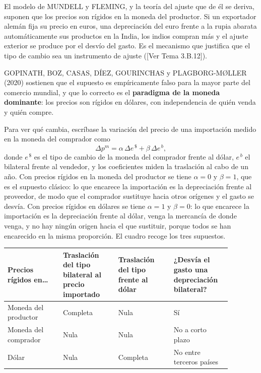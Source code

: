 \documentclass[10pt,a4paper]{article}
\newcommand{\authorfont}[1]{{\fontfamily{EBGaramond-TLF}\selectfont #1}}
\begin{document}
El modelo de MUNDELL y FLEMING, y la teoría del ajuste que de él se deriva, suponen que los precios son rígidos en la moneda del productor. Si un exportador alemán fija su precio en euros, una depreciación del euro frente a la rupia abarata automáticamente sus productos en la India, los indios compran más y el ajuste exterior se produce por el desvío del gasto. Es el mecanismo que justifica que el tipo de cambio sea un instrumento de ajuste ([\authorfont{Ver Tema 3.B.12}]).

GOPINATH, BOZ, CASAS, DÍEZ, GOURINCHAS y PLAGBORG-MØLLER (2020) sostienen que el supuesto es empíricamente falso para la mayor parte del comercio mundial, y que lo correcto es el \textbf{paradigma de la moneda dominante}: los precios son rígidos en dólares, con independencia de quién venda y quién compre.

Para ver qué cambia, escríbase la variación del precio de una importación medido en la moneda del comprador como
$$\Delta p^{m} = \alpha\,\Delta e^{\,\$} + \beta\,\Delta e^{\,b},$$
donde $e^{\,\$}$ es el tipo de cambio de la moneda del comprador frente al dólar, $e^{\,b}$ el bilateral frente al vendedor, y los coeficientes miden la traslación al cabo de un año. Con precios rígidos en la moneda del productor se tiene $\alpha=0$ y $\beta=1$, que es el supuesto clásico: lo que encarece la importación es la depreciación frente al proveedor, de modo que el comprador sustituye hacia otros orígenes y el gasto se desvía. Con precios rígidos en dólares se tiene $\alpha=1$ y $\beta=0$: lo que encarece la importación es la depreciación frente al dólar, venga la mercancía de donde venga, y no hay ningún origen hacia el que sustituir, porque todos se han encarecido en la misma proporción. El cuadro recoge los tres supuestos.

\begin{center}
{\footnotesize
\begin{tabular}{|p{0.22\linewidth}|p{0.22\linewidth}|p{0.22\linewidth}|p{0.22\linewidth}|}
\hline
\textbf{Precios rígidos en\ldots} & \textbf{Traslación del tipo bilateral al precio importado} & \textbf{Traslación del tipo frente al dólar} & \textbf{¿Desvía el gasto una depreciación bilateral?} \\
\hline
Moneda del productor & Completa & Nula & Sí \\
\hline
Moneda del comprador & Nula & Nula & No a corto plazo \\
\hline
Dólar & Nula & Completa & No entre terceros países \\
\hline
\end{tabular}}
\end{center}
\end{document}
